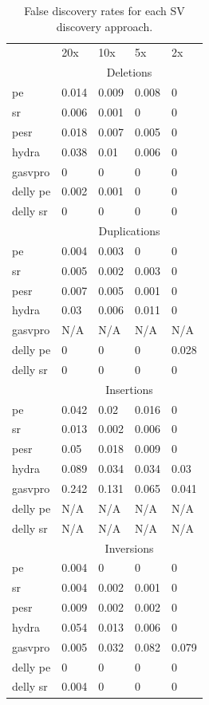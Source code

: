 \documentclass[11pt]{article}
\begin{document}
\begin{table}[h!b!p!]
\caption{False discovery rates for each SV discovery approach.}
\begin{tabular}{l|llll}
			& 20x			& 10x			& 5x			& 2x \\
\cline{2-5}
			& \multicolumn{4}{c}{Deletions} \\
\cline{1-5}
pe		&	0.014	&0.009	&0.008	&0 \\
sr      &    0.006	&0.001	&0		&0 \\
pesr    &    0.018	&0.007	&0.005	&0 \\
hydra   &    0.038	&0.01	&0.006	&0 \\
gasvpro &    0		&0		&0		&0 \\
delly pe&    0.002	&0.001	&0		&0 \\
delly sr&    0		&0		&0		&0 \\
\cline{2-5}
			& \multicolumn{4}{c}{Duplications} \\
\cline{2-5}

pe          &0.004	&0.003	&0		&0 \\
sr          &0.005	&0.002	&0.003	&0 \\
pesr        &0.007	&0.005	&0.001	&0 \\
hydra       &0.03	&0.006	&0.011	&0 \\
gasvpro     &N/A	&	N/A	&	N/A	&	N/A	 \\
delly pe    &0		&0		&0		&0.028 \\
delly sr    &0		&0		&0		&0 \\
\cline{2-5}
			& \multicolumn{4}{c}{Insertions} \\
\cline{2-5}

pe          &0.042	&0.02	&0.016	&0 \\
sr          &0.013	&0.002	&0.006	&0 \\
pesr        &0.05	&0.018	&0.009	&0 \\
hydra       &0.089	&0.034	&0.034	&0.03 \\
gasvpro     &0.242	&0.131	&0.065	&0.041 \\
delly pe    &N/A		&N/A		&N/A		&N/A \\
delly sr    &N/A		&N/A		&N/A		&N/A \\
\cline{2-5}
			& \multicolumn{4}{c}{Inversions} \\
\cline{2-5}

pe          &0.004	&0		&0		&0 \\
sr          &0.004	&0.002	&0.001	&0 \\
pesr        &0.009	&0.002	&0.002	&0 \\
hydra       &0.054	&0.013	&0.006	&0 \\
gasvpro     &0.005	&0.032	&0.082	&0.079 \\
delly pe    &0		&0		&0		&0 \\
delly sr	&0.004	&0		&0		&0 \\
\end{tabular}
\label{table:fdr}
\end{table}
\end{document}

